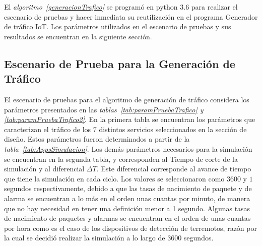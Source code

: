 El \textit{algoritmo~\ref{generacionTrafico}} se programó en python 3.6 para realizar el escenario de pruebas y hacer inmediata su reutilización en el programa Generador de tráfico IoT. Los parámetros utilizados en el escenario de pruebas y sus resultados se encuentran en la siguiente sección.\newline

\subsection{Escenario de Prueba para la Generación de Tráfico}

El escenario de pruebas para el algoritmo de generación de tráfico considera los parámetros presentados en las \textit{tablas~\ref{tab:paramPruebaTrafico} y \ref{tab:paramPruebaTrafico2}}.  En la primera tabla se encuentran los parámetros que caracterizan el tráfico de los 7 distintos servicios seleccionados en la sección de diseño. Estos parámetros fueron determinados a partir de la \textit{tabla~\ref{tab:AppsSimulacion}}. Los demás parámetros necesarios para la simulación se encuentran en la segunda tabla, y corresponden al Tiempo de corte de la simulación y al diferencial $\Delta T$. Este diferencial corresponde al avance de tiempo que tiene la simulación en cada ciclo. Los valores se seleccionaron como $3600$ y $1$ segundos respectivamente, debido a que las tasas de nacimiento de paquete y de alarma se encuentran a lo más en el orden unas cuantas por minuto, de manera que no hay necesidad en tener una definición menor a 1 segundo. Algunas tasas de nacimiento de paquetes y alarmas se encuentran en el orden de unas cuantas por hora como es el caso de los dispositivos de detección de terremotos, razón por la cual se decidió realizar la simulación a lo largo de 3600 segundos.\newline

